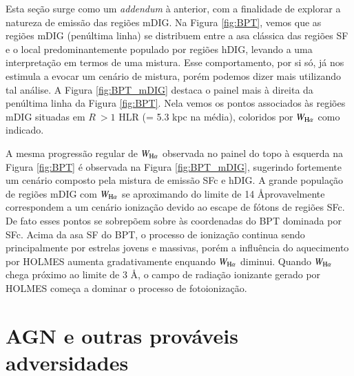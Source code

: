 Esta seção surge como um {\em addendum} à anterior, com a finalidade de explorar a natureza de emissão das regiões mDIG. Na Figura \ref{fig:BPT}, vemos que as regiões mDIG (penúltima linha) se distribuem entre a asa clássica das regiões SF e o local predominantemente populado por regiões hDIG, levando a uma interpretação em termos de uma mistura. Esse comportamento, por si só, já nos estimula a evocar um cenário de mistura, porém podemos dizer mais utilizando tal análise. A Figura \ref{fig:BPT_mDIG} destaca o painel mais à direita da penúltima linha da Figura \ref{fig:BPT}. Nela vemos os pontos associados às regiões mDIG situadas em $R\ > 1$ HLR (= 5.3 kpc na média), coloridos por $W_{\Ha}$ como indicado.

A mesma progressão regular de $W_{\Ha}$ observada no painel do topo à esquerda na Figura \ref{fig:BPT} é observada na Figura \ref{fig:BPT_mDIG}, sugerindo fortemente um cenário composto pela mistura de emissão SFc e hDIG. A grande população de regiões mDIG com $W_{\Ha}$ se aproximando do limite de 14 \AA provavelmente correspondem a um cenário ionização devido ao escape de fótons de regiões SFc. De fato esses pontos se sobrepõem sobre às coordenadas do BPT dominada por SFc. Acima da asa SF do BPT, o processo de ionização continua sendo principalmente por estrelas jovens e massivas, porém a influência do aquecimento por HOLMES aumenta gradativamente enquando $W_{\Ha}$ diminui. Quando $W_{\Ha}$ chega próximo ao limite de 3 \AA, o campo de radiação ionizante gerado por HOLMES começa a dominar o processo de fotoionização.


\section{AGN e outras prováveis adversidades}

